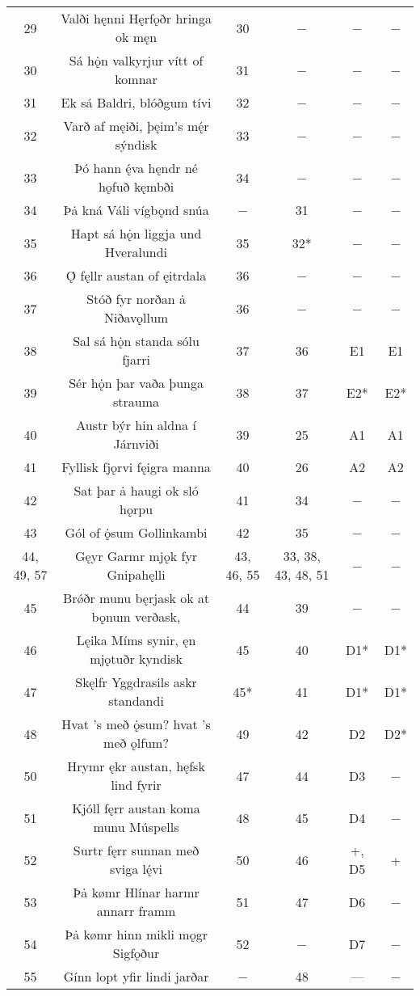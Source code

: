 \begin{longtable}{|c c c c c c|}
	29 & Valði hęnni Hęrfǫðr hringa ok męn & 30 & − & − & − \\
	30 & Sá hǫ̇n valkyrjur vítt of komnar & 31 & − & − & − \\
	31 & Ek sá Baldri, blóðgum tívi & 32 & − & − & − \\
	32 & Varð af męiði, þęim’s mę́r sýndisk & 33 & − & − & − \\
	33 & Þó hann ę́va hęndr né hǫfuð kęmbði & 34 & − & − & − \\
	34 & Þȧ kná Váli vígbǫnd snúa & − & 31 & − & − \\
	35 & Hapt sá hǫ̇n liggja und Hveralundi & 35 & 32* & − & − \\
	36 & Ǫ́ fęllr austan of ęitrdala & 36 & − & − & − \\
	37 & Stóð fyr norðan ȧ Niðavǫllum & 36 & − & − & − \\
	38 & Sal sá hǫ̇n standa sólu fjarri & 37 & 36 & E1 & E1 \\
	39 & Sér hǫ̇n þar vaða þunga strauma & 38 & 37 & E2* & E2* \\
	40 & Austr býr hin aldna í Járnviði & 39 & 25 & A1 & A1 \\
	41 & Fyllisk fjǫrvi fęigra manna & 40 & 26 & A2 & A2 \\
	42 & Sat þar ȧ haugi ok sló hǫrpu & 41 & 34 & − & − \\
	43 & Gól of ǫ̇sum Gollinkambi & 42 & 35 & − & − \\
	44, 49, 57 & Gęyr Garmr mjǫk fyr Gnipahęlli & 43, 46, 55 & 33, 38, 43, 48, 51 & − & − \\
	45 & Brǿðr munu bęrjask ok at bǫnum verðask, & 44 & 39 & − & − \\
	46 & Lęika Míms synir, ęn mjǫtuðr kyndisk & 45 & 40 & D1* & D1* \\
	47 & Skęlfr Yggdrasils askr standandi & 45* & 41 & D1* & D1* \\
	48 & Hvat ’s með ǫ̇sum? hvat ’s með ǫlfum? & 49 & 42 & D2 & D2* \\
	50 & Hrymr ękr austan, hęfsk lind fyrir & 47 & 44 & D3 & − \\
	51 & Kjóll fęrr austan koma munu Múspells & 48 & 45 & D4 & − \\
	52 & Surtr fęrr sunnan með sviga lę́vi & 50 & 46 & +, D5 & + \\
	53 & Þȧ kømr Hlínar harmr annarr framm & 51 & 47 & D6 & − \\
	54 & Þȧ kømr hinn mikli mǫgr Sigfǫður & 52 & − & D7 & − \\
	55 & Gínn lopt yfir lindi jarðar & − & 48 & — & − \\

\end{longtable}
